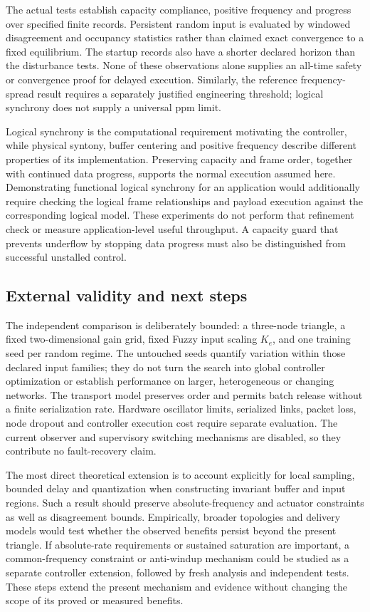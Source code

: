 The actual tests establish capacity compliance, positive frequency and
progress over specified finite records. Persistent random input is
evaluated by windowed disagreement and occupancy statistics rather
than claimed exact convergence to a fixed equilibrium. The startup
records also have a shorter declared horizon than the disturbance
tests. None of these observations alone supplies an all-time safety
or convergence proof for delayed execution. Similarly, the reference
frequency-spread result requires a separately justified engineering
threshold; logical synchrony does not supply a universal ppm limit.

Logical synchrony is the computational requirement motivating the
controller, while physical syntony, buffer centering and positive
frequency describe different properties of its implementation.
Preserving capacity and frame order, together with continued data
progress, supports the normal execution assumed here. Demonstrating
functional logical synchrony for an application would additionally
require checking the logical frame relationships and payload execution
against the corresponding logical model. These experiments do not
perform that refinement check or measure application-level useful
throughput. A capacity guard that prevents underflow by stopping data
progress must also be distinguished from successful unstalled control.

\subsection{External validity and next steps}
\label{subsec:discussion_future}

The independent comparison is deliberately bounded: a three-node
triangle, a fixed two-dimensional gain grid, fixed Fuzzy input scaling
$K_e$, and one training seed per random regime. The untouched seeds
quantify variation within those declared input families; they do not
turn the search into global controller optimization or establish
performance on larger, heterogeneous or changing networks. The
transport model preserves order and permits batch release without a
finite serialization rate. Hardware oscillator limits, serialized
links, packet loss, node dropout and controller execution cost require
separate evaluation. The current observer and supervisory switching
mechanisms are disabled, so they contribute no fault-recovery claim.

The most direct theoretical extension is to account explicitly for
local sampling, bounded delay and quantization when constructing
invariant buffer and input regions. Such a result should preserve
absolute-frequency and actuator constraints as well as disagreement
bounds. Empirically, broader topologies and delivery models would
test whether the observed benefits persist beyond the present
triangle. If absolute-rate requirements or sustained saturation are
important, a common-frequency constraint or anti-windup mechanism
could be studied as a separate controller extension, followed by
fresh analysis and independent tests. These steps extend the present
mechanism and evidence without changing the scope of its proved or
measured benefits.


